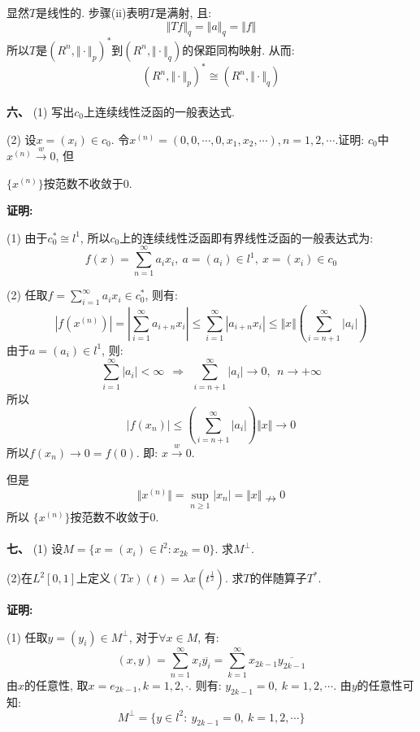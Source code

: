 \documentclass{article}
\begin{document}
显然$T$是线性的. 步骤(ii)表明$T$是满射, 且:
$$ \Vert Tf \Vert_q = \Vert a \Vert_q = \Vert f \Vert $$
所以$T$是$(R^n, \Vert \cdot \Vert_p)^*$到$(R^n, \Vert \cdot \Vert_q)$的保距同构映射. 从而:
$$ (R^n, \Vert \cdot \Vert_p)^* \cong (R^n, \Vert \cdot \Vert_q) $$  \\ 


\textbf{六、} (1) 写出$c_0$上连续线性泛函的一般表达式. 

\hspace{2em} (2) 设$x = (x_i) \in c_0$. 令$x^{(n)} = (0,0,\cdots,0,x_1, x_2, \cdots), n=1,2,\cdots$.证明: $c_0$中$x^{(n)} \xrightarrow{w} 0$, 但

\hspace{3.7em} $\{x^{(n)} \}$按范数不收敛于0. 

\textbf{证明:}

(1) 由于$c_0^* \cong l^1$, 所以$c_0$上的连续线性泛函即有界线性泛函的一般表达式为:
$$ f(x) = \sum\limits_{n=1}^{\infty}  a_i x_i, \ a=(a_i) \in l^1,\  x=(x_i) \in c_0 $$

(2) 任取$ f = \sum\limits_{i=1}^{\infty} a_i x_i \in c_0^*$, 则有:
$$ |f(x^{(n)})| = |\sum\limits_{i=1}^{\infty} a_{i+n} x_{i}| \leq \sum\limits_{i=1}^{\infty} |a_{i+n}x_i| \leq \Vert x \Vert \left( \sum\limits_{i=n+1}^{\infty}|a_i| \right) $$
由于$a=(a_i) \in l^1$, 则:
$$ \sum\limits_{i=1}^{\infty} |a_i| < \infty \ \ \Rightarrow \ \ \sum\limits_{i=n+1}^{\infty} |a_i| \rightarrow 0, \ \ n \rightarrow +\infty $$
所以
$$ | f(x_n)|  \leq  \left( \sum\limits_{i=n+1}^{\infty}|a_i| \right)\Vert x \Vert \rightarrow 0 $$
所以$f(x_n) \rightarrow 0 = f(0)$. 即: $x \xrightarrow{w} 0$. 

但是
$$ \Vert x^{(n)} \Vert = \sup\limits_{n \geq 1}|x_n| = \Vert x \Vert \nrightarrow 0 $$
所以 $\{x^{(n)} \}$按范数不收敛于0. \\  \\ 

\textbf{七、} (1) 设$M = \{ x=(x_i) \in l^2: x_{2k} = 0\}$. 求$M^{\perp}$. 

\hspace{2em} (2)在$L^2[0,1]$上定义$(Tx)(t) = \lambda x(t^{\frac{1}{2}})$. 求$T$的伴随算子$T^*$.

\textbf{证明:}

(1) 任取$y=(y_i) \in M^{\perp}$, 对于$\forall x \in M$, 有:
$$ (x, y) = \sum\limits_{n=1}^{\infty} x_i\overline{y_i} = \sum\limits_{k=1}^{\infty} x_{2k-1}\overline{y_{2k-1}} $$
由$x$的任意性, 取$x = e_{2k-1}, k=1,2, \cdot$. 则有: $y_{2k-1} = 0, \ k=1,2,\cdots$. 由$y$的任意性可知:
$$ M^{\perp} = \{ y \in l^2: \ y_{2k-1} = 0, \ k=1,2,\cdots \} $$
\end{document}
